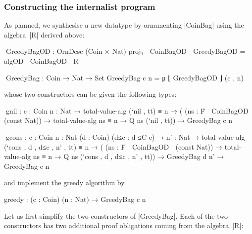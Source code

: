 \subsubsection{Constructing the internalist program}

As planned, we synthesise a new datatype by ornamenting |CoinBag| using the algebra~|R| derived above:
\begin{code}
^^^GreedyBagOD : OrnDesc (Coin × Nat) proj₁ ⌊ CoinBagOD ⌋
GreedyBagOD = algOD ⌊ CoinBagOD ⌋ R

^^^GreedyBag : Coin → Nat → Set
GreedyBag c n = μ ⌊ GreedyBagOD ⌋ (c , n)
\end{code}
whose two constructors can be given the following types:
\begin{code}
^^^gnil   :  {c : Coin} {n : Nat} →
             total-value-alg (`nil , tt) ≡ n →
             (  (ns : Ḟ ⌊ CoinBagOD ⌋ (const Nat)) →
                  total-value-alg ns ≡ n → Q ns (`nil , tt)) →
             GreedyBag c n

^^^gcons  :  {c : Coin} {n : Nat} (d : Coin) (d≤c : d ≤C c) →
             {n' : Nat} → total-value-alg (`cons , d , d≤c , n' , tt) ≡ n →
             (  (ns : Ḟ ⌊ CoinBagOD ⌋ (const Nat)) →
                  total-value-alg ns ≡ n → Q ns (`cons , d , d≤c , n' , tt)) →
             GreedyBag d n' → GreedyBag c n
\end{code}
and implement the greedy algorithm by
\begin{code}
greedy : (c : Coin) (n : Nat) → GreedyBag c n
\end{code}
Let us first simplify the two constructors of |GreedyBag|.
Each of the two constructors has two additional proof obligations coming from the algebra~|R|:
